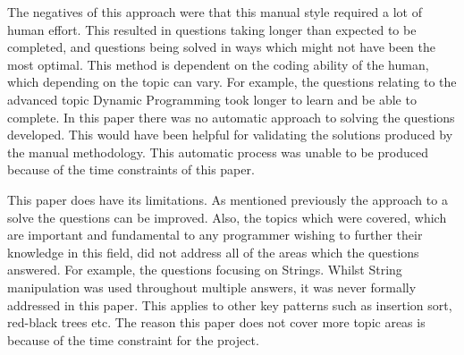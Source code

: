 \documentclass[10pt,twocolumn]{IEEEtran}
\begin{document}
The negatives of this approach were that this manual style required a lot of human effort. This resulted in questions taking longer than expected to be completed, and questions being solved in ways which might not have been the most optimal. This method is dependent on the coding ability of the human, which depending on the topic can vary. For example, the questions relating to the advanced topic Dynamic Programming took longer to learn and be able to complete.
 In this paper there was no automatic approach to solving the questions developed. This would have been helpful for validating the solutions produced by the manual methodology. This automatic process was unable to be produced because of the time constraints of this paper. 
 \par This paper does have its limitations. As mentioned previously the approach to a solve the questions can be improved. Also, the topics which were covered, which are important and fundamental to any programmer wishing to further their knowledge in this field, did not address all of the areas which the questions answered. For example, the questions focusing on Strings. Whilst String manipulation was used throughout multiple answers, it was never formally addressed in this paper. This applies to other key patterns such as insertion sort, red-black trees etc. The reason this paper does not cover more topic areas is because of the time constraint for the project.



\end{document}

